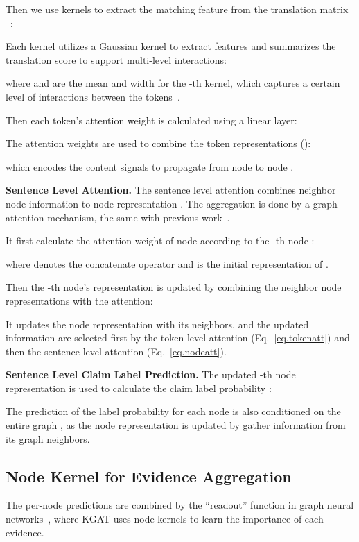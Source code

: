 \documentclass[11pt,a4paper]{article}
\begin{document}
Then we use  kernels to extract the matching feature  from the translation matrix ~\citep{xiong2017knrm,convknrm,qiao2019understanding,macavaney2019cedr}:

Each kernel  utilizes a Gaussian kernel to extract features and summarizes the translation score to support multi-level interactions: 

where  and  are the mean and width for the -th kernel, which captures a certain level of interactions between the tokens~\citep{xiong2017knrm}. 

Then each token's attention weight  is calculated using a linear layer:


The attention weights are used to combine the token representations ():

which encodes the content signals to propagate from node  to node .



\textbf{Sentence Level Attention.}
The sentence level attention combines neighbor node information to node representation .
The aggregation is done by a graph attention mechanism, the same with previous work~\citep{zhou2019gear}.

It first calculate the attention weight  of  node according to the -th node :
 
where  denotes the concatenate operator and  is the initial representation of .


Then the -th node's representation is updated by combining the neighbor node representations  with the attention:

It updates the node representation with its neighbors, and the updated information are selected first by the token level attention (Eq.~\ref{eq.tokenatt}) and then the sentence level attention (Eq.~\ref{eq.nodeatt}).



\textbf{Sentence Level Claim Label Prediction.} The updated -th node representation  is used to calculate the claim label probability :

The prediction of the label probability for each node is also conditioned on the entire graph , as the node representation is updated by gather information from its graph neighbors.


\subsection{Node Kernel for Evidence Aggregation}\label{model:node_kernel}
The per-node predictions are combined by the ``readout'' function in graph neural networks~\citep{zhou2019gear}, where KGAT uses node kernels to learn the importance of each evidence.
\end{document}
